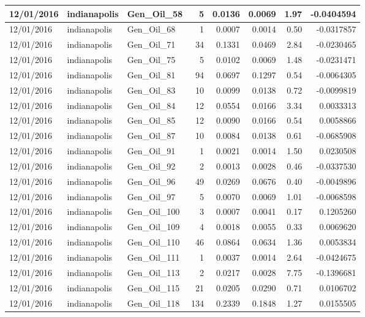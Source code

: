 \documentclass[
  letterpaper,
  DIV=11,
  numbers=noendperiod]{scrartcl}
\begin{document}
\begin{tabular}{l|l|l|r|r|r|r|r}
\hline
12/01/2016 & indianapolis & Gen\_Oil\_58 & 5 & 0.0136 & 0.0069 & 1.97 & -0.0404594\\
\hline
12/01/2016 & indianapolis & Gen\_Oil\_68 & 1 & 0.0007 & 0.0014 & 0.50 & -0.0317857\\
\hline
12/01/2016 & indianapolis & Gen\_Oil\_71 & 34 & 0.1331 & 0.0469 & 2.84 & -0.0230465\\
\hline
12/01/2016 & indianapolis & Gen\_Oil\_75 & 5 & 0.0102 & 0.0069 & 1.48 & -0.0231471\\
\hline
12/01/2016 & indianapolis & Gen\_Oil\_81 & 94 & 0.0697 & 0.1297 & 0.54 & -0.0064305\\
\hline
12/01/2016 & indianapolis & Gen\_Oil\_83 & 10 & 0.0099 & 0.0138 & 0.72 & -0.0099819\\
\hline
12/01/2016 & indianapolis & Gen\_Oil\_84 & 12 & 0.0554 & 0.0166 & 3.34 & 0.0033313\\
\hline
12/01/2016 & indianapolis & Gen\_Oil\_85 & 12 & 0.0090 & 0.0166 & 0.54 & 0.0058866\\
\hline
12/01/2016 & indianapolis & Gen\_Oil\_87 & 10 & 0.0084 & 0.0138 & 0.61 & -0.0685908\\
\hline
12/01/2016 & indianapolis & Gen\_Oil\_91 & 1 & 0.0021 & 0.0014 & 1.50 & 0.0230508\\
\hline
12/01/2016 & indianapolis & Gen\_Oil\_92 & 2 & 0.0013 & 0.0028 & 0.46 & -0.0337530\\
\hline
12/01/2016 & indianapolis & Gen\_Oil\_96 & 49 & 0.0269 & 0.0676 & 0.40 & -0.0049896\\
\hline
12/01/2016 & indianapolis & Gen\_Oil\_97 & 5 & 0.0070 & 0.0069 & 1.01 & -0.0068598\\
\hline
12/01/2016 & indianapolis & Gen\_Oil\_100 & 3 & 0.0007 & 0.0041 & 0.17 & 0.1205260\\
\hline
12/01/2016 & indianapolis & Gen\_Oil\_109 & 4 & 0.0018 & 0.0055 & 0.33 & 0.0069620\\
\hline
12/01/2016 & indianapolis & Gen\_Oil\_110 & 46 & 0.0864 & 0.0634 & 1.36 & 0.0053834\\
\hline
12/01/2016 & indianapolis & Gen\_Oil\_111 & 1 & 0.0037 & 0.0014 & 2.64 & -0.0424675\\
\hline
12/01/2016 & indianapolis & Gen\_Oil\_113 & 2 & 0.0217 & 0.0028 & 7.75 & -0.1396681\\
\hline
12/01/2016 & indianapolis & Gen\_Oil\_115 & 21 & 0.0205 & 0.0290 & 0.71 & 0.0106702\\
\hline
12/01/2016 & indianapolis & Gen\_Oil\_118 & 134 & 0.2339 & 0.1848 & 1.27 & 0.0155505\\

\end{tabular}
\end{document}

